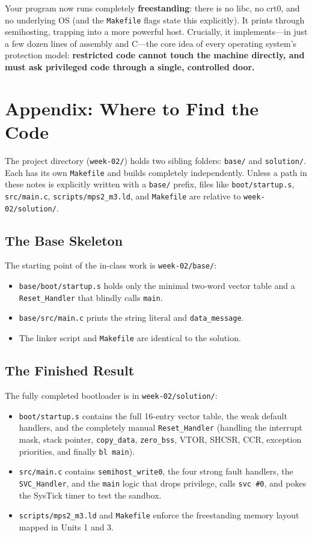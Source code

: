 Your program now runs completely \textbf{freestanding}: there is no libc, no crt0, and no underlying OS (and the \texttt{Makefile} flags state this explicitly). It prints through semihosting, trapping into a more powerful host. Crucially, it implements---in just a few dozen lines of assembly and C---the core idea of every operating system's protection model: \textbf{restricted code cannot touch the machine directly, and must ask privileged code through a single, controlled door.}

\section{Appendix: Where to Find the Code}
The project directory (\texttt{week-02/}) holds two sibling folders: \texttt{base/} and \texttt{solution/}. Each has its own \texttt{Makefile} and builds completely independently. Unless a path in these notes is explicitly written with a \texttt{base/} prefix, files like \texttt{boot/startup.s}, \texttt{src/main.c}, \texttt{scripts/mps2\_m3.ld}, and \texttt{Makefile} are relative to \texttt{week-02/solution/}.

\subsection{The Base Skeleton}
The starting point of the in-class work is \texttt{week-02/base/}:
\begin{itemize}
    \item \texttt{base/boot/startup.s} holds only the minimal two-word vector table and a \texttt{Reset\_Handler} that blindly calls \texttt{main}.
    \item \texttt{base/src/main.c} prints the string literal and \texttt{data\_message}.
    \item The linker script and \texttt{Makefile} are identical to the solution.
\end{itemize}

\subsection{The Finished Result}
The fully completed bootloader is in \texttt{week-02/solution/}:
\begin{itemize}
    \item \texttt{boot/startup.s} contains the full 16-entry vector table, the weak default handlers, and the completely manual \texttt{Reset\_Handler} (handling the interrupt mask, stack pointer, \texttt{copy\_data}, \texttt{zero\_bss}, VTOR, SHCSR, CCR, exception priorities, and finally \texttt{bl main}).
    \item \texttt{src/main.c} contains \texttt{semihost\_write0}, the four strong fault handlers, the \texttt{SVC\_Handler}, and the \texttt{main} logic that drops privilege, calls \texttt{svc \#0}, and pokes the SysTick timer to test the sandbox.
    \item \texttt{scripts/mps2\_m3.ld} and \texttt{Makefile} enforce the freestanding memory layout mapped in Units 1 and 3.
\end{itemize}



